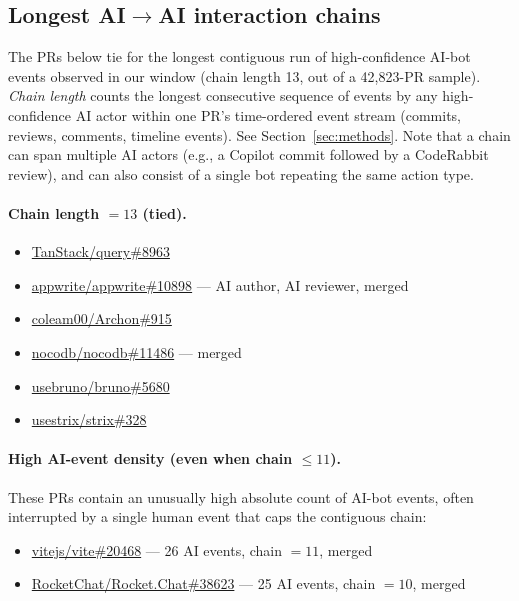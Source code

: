 \subsection{Longest AI$\to$AI interaction chains}
\label{app:examples-chains}

The PRs below tie for the longest contiguous run of high-confidence AI-bot
events observed in our window (chain length 13, out of a 42{,}823-PR
sample). \emph{Chain length} counts the longest consecutive sequence of
events by any high-confidence AI actor within one PR's time-ordered event
stream (commits, reviews, comments, timeline events). See
Section~\ref{sec:methods}. Note that a chain can span multiple AI
actors (e.g., a Copilot commit followed by a CodeRabbit review), and can
also consist of a single bot repeating the same action type.

\paragraph{Chain length $= 13$ (tied).}
\begin{itemize}\itemsep0pt\parskip0pt
  \item \href{https://github.com/TanStack/query/pull/8963}{TanStack/query\#8963}
  \item \href{https://github.com/appwrite/appwrite/pull/10898}{appwrite/appwrite\#10898} --- AI author, AI reviewer, merged
  \item \href{https://github.com/coleam00/Archon/pull/915}{coleam00/Archon\#915}
  \item \href{https://github.com/nocodb/nocodb/pull/11486}{nocodb/nocodb\#11486} --- merged
  \item \href{https://github.com/usebruno/bruno/pull/5680}{usebruno/bruno\#5680}
  \item \href{https://github.com/usestrix/strix/pull/328}{usestrix/strix\#328}
\end{itemize}

\paragraph{High AI-event density (even when chain $\le 11$).}
These PRs contain an unusually high absolute count of AI-bot events, often
interrupted by a single human event that caps the contiguous chain:
\begin{itemize}\itemsep0pt\parskip0pt
  \item \href{https://github.com/vitejs/vite/pull/20468}{vitejs/vite\#20468} --- 26 AI events, chain $=11$, merged
  \item \href{https://github.com/RocketChat/Rocket.Chat/pull/38623}{RocketChat/Rocket.Chat\#38623} --- 25 AI events, chain $=10$, merged
\end{itemize}

